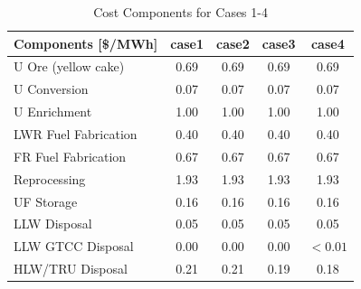 \begin{table}[htbp]
\begin{center}
\caption{Cost Components for Cases 1-4}
\label{ses_table13_}
\begin{tabular}{|l|c|c|c|c|}
\hline
\textbf{Components [\$/MWh]} & \textbf{case1} & \textbf{case2} & \textbf{case3} & \textbf{case4} \\
\hline
U Ore (yellow cake)          & 0.69            & 0.69            & 0.69            & 0.69 \\
U Conversion                 & 0.07            & 0.07            & 0.07            & 0.07 \\
U Enrichment                 & 1.00            & 1.00            & 1.00            & 1.00 \\
LWR Fuel Fabrication         & 0.40            & 0.40            & 0.40            & 0.40 \\
FR Fuel Fabrication          & 0.67            & 0.67            & 0.67            & 0.67 \\
Reprocessing                 & 1.93            & 1.93            & 1.93            & 1.93 \\
UF Storage                   & 0.16            & 0.16            & 0.16            & 0.16 \\
LLW Disposal                 & 0.05            & 0.05            & 0.05            & 0.05 \\
LLW GTCC Disposal            & 0.00            & 0.00            & 0.00            & $<0.01$ \\
HLW/TRU Disposal             & 0.21            & 0.21            & 0.19            & 0.18 \\
\hline
\end{tabular}
\end{center}
\end{table}


